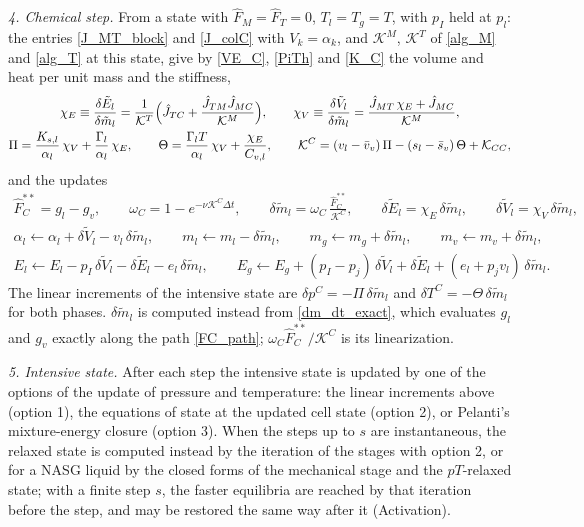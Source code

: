 \emph{4. Chemical step.} From a state with $\hat{F}_M=\hat{F}_T=0$, $T_l=T_g=T$, with $p_I$ held at $p_l$: the entries \eqref{J_MT_block} and \eqref{J_colC} with $V_k=\alpha_k$, and $\mathcal{K}^M$, $\mathcal{K}^T$ of \eqref{alg_M} and \eqref{alg_T} at this state, give by \eqref{VE_C}, \eqref{PiTh} and \eqref{K_C} the volume and heat per unit mass and the stiffness,
\begin{equation}\label{alg_C_coef}
\begin{gathered}
\chi_E\equiv\frac{\delta\tilde{E}_l}{\delta\tilde{m}_l}=\frac1{\mathcal{K}^T}\Bigl(\hat{J}_{TC}+\frac{\hat{J}_{TM}\hat{J}_{MC}}{\mathcal{K}^M}\Bigr),\qquad
\chi_V\equiv\frac{\delta\tilde{V}_l}{\delta\tilde{m}_l}=\frac{\hat{J}_{MT}\,\chi_E+\hat{J}_{MC}}{\mathcal{K}^M},\\
\Pi=\frac{K_{s,l}}{\alpha_l}\,\chi_V+\frac{\Gamma_l}{\alpha_l}\,\chi_E,\qquad \Theta=\frac{\Gamma_lT}{\alpha_l}\,\chi_V+\frac{\chi_E}{C_{v,l}},\qquad
\mathcal{K}^C=(v_l-\bar v_v)\,\Pi-(s_l-\bar s_v)\,\Theta+\mathcal{K}_{CC},
\end{gathered}
\end{equation}
and the updates
\begin{equation}\label{alg_C}
\begin{gathered}
\hat{F}_C^{**}=g_l-g_v,\qquad \omega_C=1-e^{-\nu\mathcal{K}^C\Delta t},\qquad \delta\tilde{m}_l=\omega_C\,\frac{\hat{F}_C^{**}}{\mathcal{K}^C},\qquad \delta\tilde{E}_l=\chi_E\,\delta\tilde{m}_l,\qquad \delta\tilde{V}_l=\chi_V\,\delta\tilde{m}_l,\\
\alpha_l\leftarrow\alpha_l+\delta\tilde{V}_l-v_l\,\delta\tilde{m}_l,\qquad m_l\leftarrow m_l-\delta\tilde{m}_l,\qquad m_g\leftarrow m_g+\delta\tilde{m}_l,\qquad m_v\leftarrow m_v+\delta\tilde{m}_l,\\
E_l\leftarrow E_l-p_I\,\delta\tilde{V}_l-\delta\tilde{E}_l-e_l\,\delta\tilde{m}_l,\qquad E_g\leftarrow E_g+(p_I-p_{j})\,\delta\tilde{V}_l+\delta\tilde{E}_l+(e_l+p_{j}v_l)\,\delta\tilde{m}_l .
\end{gathered}
\end{equation}
The linear increments of the intensive state are $\delta p^C=-\Pi\,\delta\tilde{m}_l$ and $\delta T^C=-\Theta\,\delta\tilde{m}_l$ for both phases. $\delta\tilde{m}_l$ is computed instead from \eqref{dm_dt_exact}, which evaluates $g_l$ and $g_v$ exactly along the path \eqref{FC_path}; $\omega_C\hat{F}_C^{**}/\mathcal{K}^C$ is its linearization.

\emph{5. Intensive state.} After each step the intensive state is updated by one of the options of the update of pressure and temperature: the linear increments above (option 1), the equations of state at the updated cell state (option 2), or Pelanti's mixture-energy closure (option 3). When the steps up to $s$ are instantaneous, the relaxed state is computed instead by the iteration of the stages with option 2, or for a NASG liquid by the closed forms of the mechanical stage and the $pT$-relaxed state; with a finite step $s$, the faster equilibria are reached by that iteration before the step, and may be restored the same way after it (Activation).

